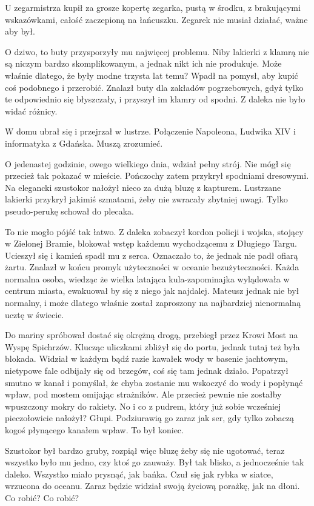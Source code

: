 U zegarmistrza kupił za grosze kopertę zegarka, pustą w środku, z brakującymi wskazówkami, całość zaczepioną na łańcuszku.
Zegarek nie musiał działać, ważne aby był.

O dziwo, to buty przysporzyły mu najwięcej problemu.
Niby lakierki z klamrą nie są niczym bardzo skomplikowanym, a jednak nikt ich nie produkuje.
Może właśnie dlatego, że były modne trzysta lat temu?
Wpadł na pomysł, aby kupić coś podobnego i przerobić.
Znalazł buty dla zakładów pogrzebowych, gdyż tylko te odpowiednio się błyszczały, i przyszył im klamry od spodni.
Z daleka nie było widać różnicy.

W domu ubrał się i przejrzał w lustrze.
Połączenie Napoleona, Ludwika XIV i informatyka z Gdańska.
Muszą zrozumieć.

O jedenastej godzinie, owego wielkiego dnia, wdział pełny strój.
Nie mógł się przecież tak pokazać w mieście.
Pończochy zatem przykrył spodniami dresowymi.
Na elegancki szustokor nałożył nieco za dużą bluzę z kapturem.
Lustrzane lakierki przykrył jakimiś szmatami, żeby nie zwracały zbytniej uwagi.
Tylko pseudo-perukę schował do plecaka.

To nie mogło pójść tak łatwo.
Z daleka zobaczył kordon policji i wojska, stojący w Zielonej Bramie, blokował wstęp każdemu wychodzącemu z Długiego Targu.
Ucieszył się i kamień spadł mu z serca. Oznaczało to, że jednak nie padł ofiarą żartu.
Znalazł w końcu promyk użyteczności w oceanie bezużyteczności. Każda normalna osoba, wiedząc że wielka latająca kula-zapominajka wylądowała w centrum miasta,
ewakuował by się z niego jak najdalej. 
Mateusz jednak nie był normalny, i może dlatego właśnie został zaproszony na najbardziej nienormalną ucztę w świecie.

Do mariny spróbował dostać się okrężną drogą, przebiegł przez Krowi Most na Wyspę Spichrzów.
Klucząc uliczkami zbliżył się do portu, jednak tutaj też była blokada.
Widział w każdym bądź razie kawałek wody w basenie jachtowym, nietypowe fale odbijały się od brzegów, coś się tam jednak działo.
Popatrzył smutno w kanał i pomyślał, że chyba zostanie mu wskoczyć do wody i popłynąć wpław, pod mostem omijając strażników.
Ale przecież pewnie nie zostałby wpuszczony mokry do rakiety.
No i co z pudrem, który już sobie wcześniej pieczołowicie nałożył?
Głupi. Podziurawią go zaraz jak ser, gdy tylko zobaczą kogoś płynącego kanałem wpław.
To był koniec.

Szustokor był bardzo gruby, rozpiął więc bluzę żeby się nie ugotować, teraz wszystko było mu jedno, czy ktoś go zauważy.
Był tak blisko, a jednocześnie tak daleko. Wszystko miało prysnąć, jak bańka.
Czuł się jak rybka w siatce, wrzucona do oceanu.
Zaraz będzie widział swoją życiową porażkę, jak na dłoni.
Co robić? Co robić?

